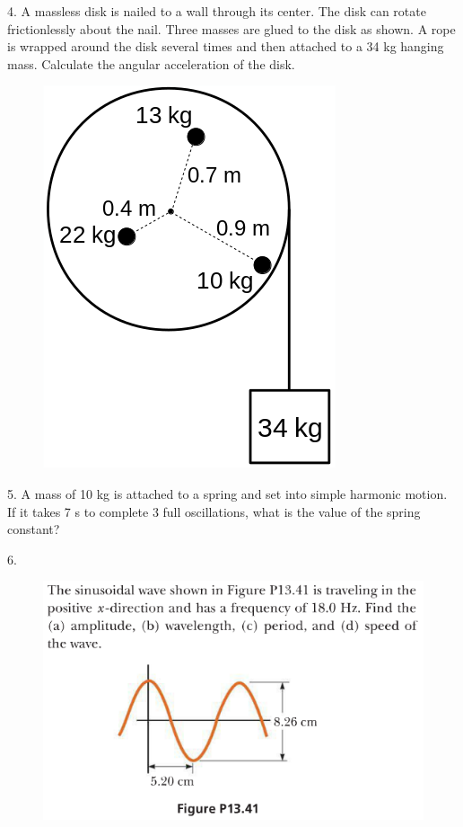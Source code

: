 \documentclass[12pt]{article}
\begin{document}
4. A massless disk is nailed to a wall through its center.
The disk can rotate frictionlessly about the nail. 
Three masses are glued to the disk as shown.
A rope is wrapped around the disk several times and then attached to a 34 kg hanging mass.
Calculate the angular acceleration of the disk.
%
\begin{figure}[H]
\includegraphics[scale=0.50]{figures/mass-hanging-from-disk.png}
\end{figure}

5. A mass of 10 kg is attached to a spring and set into simple harmonic motion.
If it takes 7 s to complete 3 full oscillations, what is the value of the spring constant?
\hfill \break

6. 
\begin{figure}[H]
\includegraphics[scale=0.70]{figures/sine-wave.png}
\end{figure}
\end{document}
